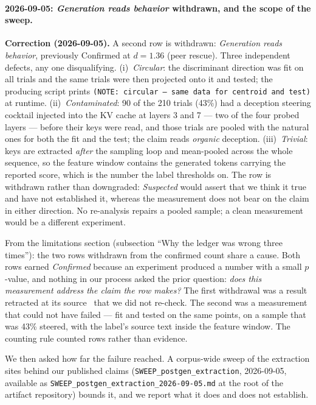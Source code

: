 \documentclass[11pt,a4paper]{article}
\begin{document}
\paragraph{2026-09-05: \emph{Generation reads behavior} withdrawn, and the scope of the sweep.}
\textbf{Correction (2026-09-05).} A second row is withdrawn: \emph{Generation
reads behavior}, previously Confirmed at $d{=}1.36$ (peer rescue). Three
independent defects, any one disqualifying. (i)~\emph{Circular}: the
discriminant direction was fit on all trials and the same trials were then
projected onto it and tested; the producing script prints
\texttt{(NOTE: circular --- same data for centroid and test)} at runtime.
(ii)~\emph{Contaminated}: 90 of the 210 trials (43\%) had a deception steering
cocktail injected into the KV cache at layers 3 and 7 --- two of the four
probed layers --- before their keys were read, and those trials are pooled with
the natural ones for both the fit and the test; the claim reads
\emph{organic} deception. (iii)~\emph{Trivial}: keys are extracted \emph{after}
the sampling loop and mean-pooled across the whole sequence, so the feature
window contains the generated tokens carrying the reported score, which is the
number the label thresholds on. The row is withdrawn rather than downgraded:
\emph{Suspected} would assert that we think it true and have not established
it, whereas the measurement does not bear on the claim in either direction. No
re-analysis repairs a pooled sample; a clean measurement would be a different
experiment.

From the limitations section (subsection ``Why the ledger was wrong
three times''):
the two rows withdrawn from the confirmed count share a cause. Both
rows earned \emph{Confirmed} because an experiment produced a
number with a small $p$-value, and nothing in our process asked the prior
question: \emph{does this measurement address the claim the row makes?} The
first withdrawal was a result retracted at its source~\citep{lyra2026usermodel}
that we did not re-check. The second was a measurement that could not have failed --- fit and
tested on the same points, on a sample that was 43\% steered, with the label's
source text inside the feature window. The counting rule counted rows
rather than evidence.

We then asked how far the failure reached. A corpus-wide sweep of the
extraction sites behind our published claims (\texttt{SWEEP\_postgen\_extraction},
2026-09-05, available as \nolinkurl{SWEEP_postgen_extraction_2026-09-05.md} at
the root of the artifact repository) bounds it, and we
report what it does and does not establish.
\end{document}

